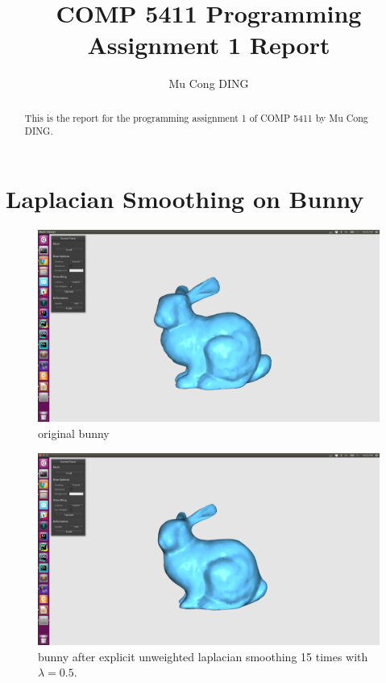 \documentclass[twocolumn, a4paper]{article}
\title{COMP 5411 Programming Assignment 1 Report }
\author{Mu Cong DING}
\begin{document}
\maketitle

\begin{abstract}
This is the report for the programming assignment 1 of COMP 5411 by Mu Cong DING.
\end{abstract}

\section{Laplacian Smoothing on Bunny}
\begin{figure}[H]
	\centering
	\includegraphics[width=1.0\linewidth]{bunny.png}
	\caption{original bunny}
\end{figure}
\begin{figure}[H]
	\centering
	\includegraphics[width=1.0\linewidth]{bunny_en_15.png}
	\caption{bunny after explicit unweighted laplacian smoothing 15 times with $\lambda=0.5$.}
\end{figure}
\end{document}
